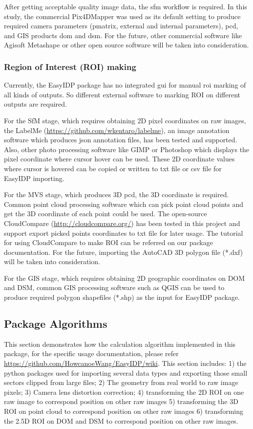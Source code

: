 \documentclass[doublespacing]{configs/bmcart}
\begin{document}
After getting acceptable quality image data, the \acrshort*{sfm} workflow is required. In this study, the commercial Pix4DMapper was used as its default setting to produce required camera parameters (pmatrix, external and internal parameters), \acrshort*{pcd}, and GIS products \acrshort*{dom} and \acrshort*{dsm}. For the future, other commercial software like Agisoft Metashape or other open source software will be taken into consideration.

\subsubsection*{Region of Interest (ROI) making}
Currently, the EasyIDP package has no integrated \acrfull*{gui} for manual \acrshort*{roi} marking of all kinds of outputs. So different external software to marking ROI on different outputs are required.

For the SfM stage, which requires obtaining 2D pixel coordinates on raw images, the LabelMe (\url{https://github.com/wkentaro/labelme}), an image annotation software which produces json annotation files, has been tested and supported. Also, other photo processing software like GIMP or Photoshop which displays the pixel coordinate where cursor hover can be used. These 2D coordinate values where cursor is hovered can be copied or written to txt file or csv file for EasyIDP importing.

For the MVS stage, which produces 3D \acrshort*{pcd}, the 3D coordinate is required. Common point cloud processing software which can pick point cloud points and get the 3D coordinate of each point could be used. The open-source CloudCompare (\url{http://cloudcompare.org/}) has been tested in this project and support export picked points coordinates to txt file for later usage. The tutorial for using CloudCompare to make ROI can be referred on our package documentation. For the future, importing the AutoCAD 3D polygon file (*.dxf) will be taken into consideration.

For the GIS stage, which requires obtaining 2D geographic coordinates on DOM and DSM, common GIS processing software such as QGIS can be used to produce required polygon shapefiles (*.shp) as the input for EasyIDP package.

\subsection*{Package Algorithms}
This section demonstrates how the calculation algorithm implemented in this package, for the specific usage documentation, please refer \url{https://github.com/HowcanoeWang/EasyIDP/wiki}. This section includes: 1) the python packages used for importing several data types and exporting those small sectors clipped from large files; 2) The geometry from real world to raw image pixels; 3) Camera lens distortion correction; 4) transforming the 2D ROI on one raw image to correspond position on other raw images 5) transforming the 3D ROI on point cloud to correspond position on other raw images 6) transforming the 2.5D ROI on DOM and DSM to correspond position on other raw images.
\end{document}
